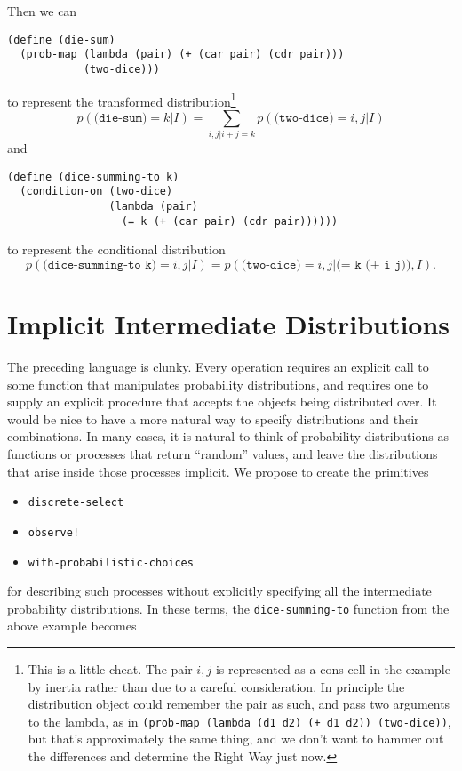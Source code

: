 \documentclass[12pt]{article}
\newcommand{\code}[1]{\texttt{#1}}
\begin{document}
Then we can
\begin{verbatim}
(define (die-sum)
  (prob-map (lambda (pair) (+ (car pair) (cdr pair)))
            (two-dice)))
\end{verbatim}
to represent the transformed distribution\footnote{This is a little cheat.
The pair $i, j$ is
represented as a cons cell in the example by inertia rather than due
to a careful consideration.  In principle the distribution object
could remember the pair as such, and pass two arguments to the lambda,
as in \code{(prob-map (lambda (d1 d2) (+ d1 d2)) (two-dice))}, but
that's approximately the same thing, and we don't want to hammer out
the differences and determine the Right Way just now.}
\[ p( \code{(die-sum)} = k | I) = \sum_{i, j | i + j = k} p( \code{(two-dice)} = i, j | I) \]
and
\begin{verbatim}
(define (dice-summing-to k)
  (condition-on (two-dice)
                (lambda (pair)
                  (= k (+ (car pair) (cdr pair))))))
\end{verbatim}
to represent the conditional distribution
\[ p( \code{(dice-summing-to k)} = i, j | I ) =
   p( \code{(two-dice)} = i, j | \code{(= k (+ i j))}, I). \]

\section{Implicit Intermediate Distributions}
\label{implicit}

The preceding language is clunky.  Every operation requires an 
explicit call to some function that manipulates
probability distributions, and requires one to supply an explicit
procedure that accepts the
objects being distributed over.  It would be nice to have a
more natural way to specify distributions and their combinations.  In
many cases, it is natural to think of probability distributions as
functions or processes that return ``random'' values, and leave the
distributions that arise inside those processes implicit.  We propose
to create the primitives
\begin{itemize}
\item \code{discrete-select}
\item \code{observe!}
\item \code{with-probabilistic-choices}
\end{itemize}
for describing such processes without explicitly specifying all the
intermediate probability distributions.  In these terms, the
\code{dice-summing-to} function from the above example becomes
\end{document}
